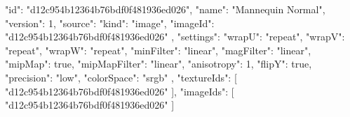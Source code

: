 {
  "id": "d12c954b12364b76bdf0f481936ed026",
  "name": "Mannequin Normal",
  "version": 1,
  "source": {
    "kind": "image",
    "imageId": "d12c954b12364b76bdf0f481936ed026"
  },
  "settings": {
    "wrapU": "repeat",
    "wrapV": "repeat",
    "wrapW": "repeat",
    "minFilter": "linear",
    "magFilter": "linear",
    "mipMap": true,
    "mipMapFilter": "linear",
    "anisotropy": 1,
    "flipY": true,
    "precision": "low",
    "colorSpace": "srgb"
  },
  "textureIds": [
    "d12c954b12364b76bdf0f481936ed026"
  ],
  "imageIds": [
    "d12c954b12364b76bdf0f481936ed026"
  ]
}
